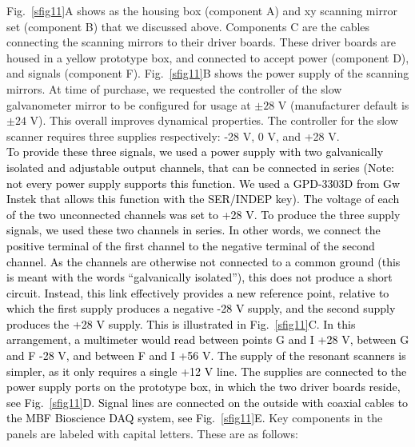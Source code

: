 \documentclass[10pt,letterpaper]{article}
\begin{document}
%
Fig.~\ref{sfig11}A shows as the housing box (component A) and xy scanning mirror set (component B) that we discussed above. Components C are the cables connecting the scanning mirrors to their driver boards. These driver boards are housed in a yellow prototype box, and connected to accept power (component D), and signals (component F). Fig.~\ref{sfig11}B shows the power supply of the scanning mirrors. At time of purchase, we requested the controller of the slow galvanometer mirror to be configured for usage at $\pm 28\text{ V}$ (manufacturer default is $\pm 24\text{ V}$). This overall improves dynamical properties. The controller for the slow scanner requires three supplies respectively: -28 V, 0 V, and +28 V. \\
\textcolor{black}{To provide these three signals, we used a power supply with two galvanically isolated and adjustable output channels, that can be connected in series (Note: not every power supply supports this function. We used a GPD-3303D from Gw Instek that allows this function with the SER/INDEP key). The voltage of each of the two unconnected channels was set to +28 V. To produce the three supply signals, we used these two channels in series. In other words, we connect the positive terminal of the first channel to the negative terminal of the second channel. As the channels are otherwise not connected to a common ground (this is meant with the words ``galvanically isolated''), this does not produce a short circuit. Instead, this link effectively provides a new reference point, relative to which the first supply produces a negative -28 V supply, and the second supply produces the +28 V supply. This is illustrated in Fig.~\ref{sfig11}C. In this arrangement, a multimeter would read between points G and I +28 V, between G and F -28 V, and between F and I +56 V. The supply of the resonant scanners is simpler, as it only requires a single +12 V line. The supplies are connected to the power supply ports on the prototype box, in which the two driver boards reside, see Fig.~\ref{sfig11}D. Signal lines are connected on the outside with coaxial cables to the MBF Bioscience DAQ system, see Fig.~\ref{sfig11}E.} Key components in the panels are labeled with capital letters. These are as follows:
\end{document}
